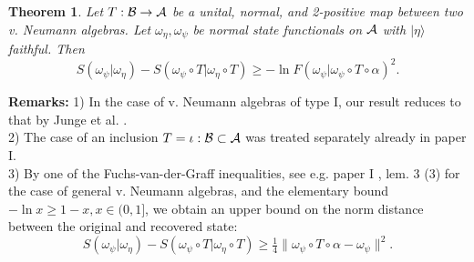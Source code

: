 \documentclass[english,a4paper,12pt]{article}
\newtheorem{theorem}{Theorem}
\def\cA{{\mathfrak A}}
\def\cB{{\mathfrak B}}
\newcommand{\ca}[1]{{\cal #1}}
\newcommand{\ben}{\begin{equation}}
\newcommand{\een}{\end{equation}}
\def\cA{{\ca A}}
\def\cB{{\ca B}}
\renewcommand{\log}{\operatorname{ln}}
\begin{document}
\begin{theorem}\label{thm:2}
Let $T: \cB \to \cA$ be a unital, normal, and 2-positive map between two v. Neumann algebras. Let $\omega_\eta,\omega_\psi$ be normal 
state functionals on $\cA$ with $|\eta\rangle$ faithful. Then
\ben
S(\omega_\psi | \omega_\eta) - S(\omega_\psi \circ T | \omega_\eta \circ T)
 \ge -\log F(\omega_\psi | \omega_\psi \circ T \circ  \alpha)^2.
\een
\end{theorem}
\noindent
 {\bf Remarks:}
1) In the case of v. Neumann algebras of type I, our result reduces to that by Junge et al. \cite{Junge}. \\
2) The case of an inclusion $T=\iota :\cB \subset \cA$ was treated separately already in paper I.\\
3) By one of the Fuchs-van-der-Graff inequalities, see e.g. paper I  \cite{Faulkner:2020iou}, lem. 3 (3) for the case of general v. Neumann algebras, 
and the elementary bound $-\log x \ge 1-x, x \in (0,1]$, we obtain an upper bound on the norm distance between the original and recovered state:
\ben
S(\omega_\psi | \omega_\eta) - S(\omega_\psi \circ T | \omega_\eta \circ T)
 \ge \tfrac{1}{4} \| \omega_\psi \circ T \circ  \alpha - \omega_\psi\|^2.
\een
\medskip
\end{document}
